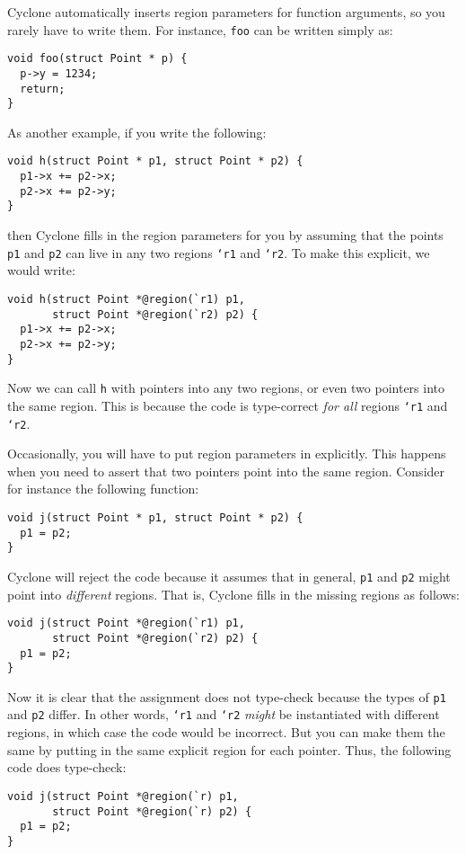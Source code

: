 Cyclone automatically inserts region parameters for function
arguments, so you rarely have to write them.  For instance,
\texttt{foo} can be written simply as:
\begin{verbatim}
void foo(struct Point * p) {
  p->y = 1234;
  return;
}
\end{verbatim}
As another example, if you write the following:
\begin{verbatim}
void h(struct Point * p1, struct Point * p2) {
  p1->x += p2->x;
  p2->x += p2->y;
}
\end{verbatim}
then Cyclone fills in the region parameters for you by assuming
that the points \texttt{p1} and \texttt{p2} can live in any
two regions \texttt{`r1} and \texttt{`r2}.  To make this explicit,
we would write:
\begin{verbatim}
void h(struct Point *@region(`r1) p1, 
       struct Point *@region(`r2) p2) {
  p1->x += p2->x;
  p2->x += p2->y;
}
\end{verbatim}
Now we can call \texttt{h} with pointers into any two regions,
or even two pointers into the same region.  This is because
the code is type-correct \emph{for all} regions \texttt{`r1} and \texttt{`r2}.

Occasionally, you will have to put region parameters in explicitly.
This happens when you need to assert that two pointers point into 
the same region.  Consider for instance the following function:
\begin{verbatim}
void j(struct Point * p1, struct Point * p2) {
  p1 = p2;
}
\end{verbatim}
Cyclone will reject the code because it assumes that in general,
\texttt{p1} and \texttt{p2} might point into \emph{different} regions.
That is, Cyclone fills in the missing regions as follows:
\begin{verbatim}
void j(struct Point *@region(`r1) p1, 
       struct Point *@region(`r2) p2) {
  p1 = p2;
}
\end{verbatim}
Now it is clear that the assignment does not type-check because
the types of \texttt{p1} and \texttt{p2} differ.  In other words,
\texttt{`r1} and \texttt{`r2} \emph{might} be instantiated with
different regions, in which case the code would be incorrect.
But you can make them the same by putting in the same explicit region
for each pointer.  Thus, the following code does type-check:
\begin{verbatim}
void j(struct Point *@region(`r) p1, 
       struct Point *@region(`r) p2) {
  p1 = p2;
}
\end{verbatim}

